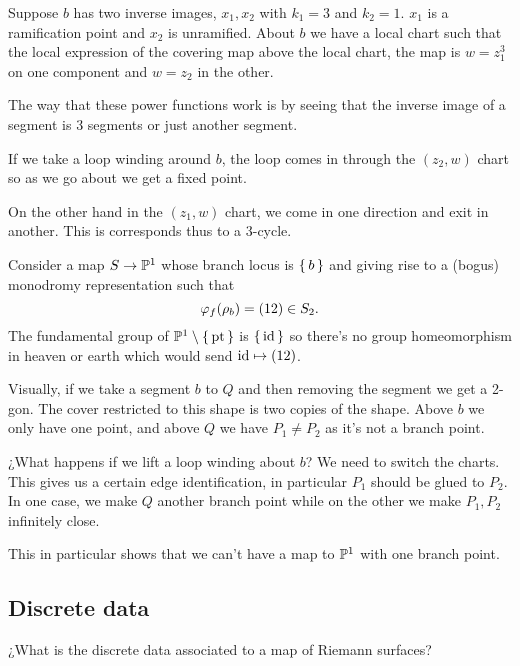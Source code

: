 \documentclass[12pt]{memoir}
\begin{document}
\begin{Ex}
    Suppose $b$ has two inverse images, $x_1,x_2$ with $k_1=3$ and $k_2=1$. $x_1$ is a ramification point and $x_2$ is unramified. About $b$ we have a local chart such that the local expression of the covering map above the local chart, the map is $w=z_1^3$ on one component and $w=z_2$ in the other.\par
    The way that these power functions work is by seeing that the inverse image of a segment is 3 segments or just another segment.\par
    If we take a loop winding around $b$, the loop comes in through the $(z_2,w)$ chart so as we go about we get a fixed point.\par
    On the other hand in the $(z_1,w)$ chart, we come in one direction and exit in another. This is corresponds thus to a $3$-cycle.
 \end{Ex}

 \begin{Ex}
    Consider a map $S\to\mathbb{P}^1$ whose branch locus is $\{\,b\,\}$ and giving rise to a (bogus) monodromy representation such that 
    $$\varphi_f(\rho_b)=(12)\in S_2.$$
    The fundamental group of $\mathbb{P}^1\setminus\{\,\text{pt}\,\}$ is $\{\,\operatorname{id}\,\}$ so there's no group homeomorphism in heaven or earth which would send $\operatorname{id}\mapsto (12)$.\par
    Visually, if we take a segment $b$ to $Q$ and then removing the segment we get a 2-gon. The cover restricted to this shape is two copies of the shape. Above $b$ we only have one point, and above $Q$ we have $P_1\neq P_2$ as it's not a branch point.\par
    ¿What happens if we lift a loop winding about $b$? We need to switch the charts. This gives us a certain edge identification, in particular $P_1$ should be glued to $P_2$. In one case, we make $Q$ another branch point while on the other we make $P_1,P_2$ infinitely close.
 \end{Ex}

 This in particular shows that we can't have a map to $\mathbb{P}^1$ with one branch point. 

 \subsection{Discrete data}

 \begin{significant}
    ¿What is the discrete data associated to a map of Riemann surfaces?
 \end{significant}
\end{document}
